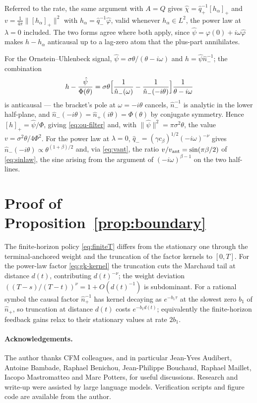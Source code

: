 \documentclass[11pt]{article}
\newcommand{\pluspart}[1]{\left[#1\right]_+}
\theoremstyle{plain}
\theoremstyle{definition}
\theoremstyle{remark}
\begin{document}
Referred to the rate, the same argument with $A=Q$ gives $\hat\chi=\hat q_+^{-1}\pluspart{h_\alpha}$ and $v=\frac1{4\pi}\|\pluspart{h_\alpha}\|^2$ with $h_\alpha=\hat q_-^{-1}\hat\varphi$, valid whenever $h_\alpha\in L^2$, the power law at $\lambda=0$ included. The two forms agree where both apply, since $\hat\psi=\varphi(0)+i\omega\hat\varphi$ makes $h-h_\alpha$ anticausal up to a lag-zero atom that the plus-part annihilates.

For the Ornstein--Uhlenbeck signal, $\hat\psi=\sigma\theta/(\theta-i\omega)$ and $h=\hat\psi\hat n_-^{-1}$; the combination
\[
h - \frac{\hat\psi}{\Phi(\theta)} = \sigma\theta\Bigl[\frac{1}{\hat n_-(\omega)} - \frac{1}{\hat n_-(-i\theta)}\Bigr]\frac{1}{\theta-i\omega}
\]
is anticausal --- the bracket's pole at $\omega=-i\theta$ cancels, $\hat n_-^{-1}$ is analytic in the lower half-plane, and $\hat n_-(-i\theta)=\hat n_+(i\theta)=\Phi(\theta)$ by conjugate symmetry. Hence $\pluspart{h}=\hat\psi/\Phi$, giving \eqref{eq:ou-filter} and, with $\|\hat\psi\|^2=\pi\sigma^2\theta$, the value $v=\sigma^2\theta/4\Phi^2$. For the power law at $\lambda=0$, $\hat q_-=(\gamma c_\beta)^{1/2}(-i\omega)^{-\nu}$ gives $\hat n_-(-i\theta)\propto\theta^{(1+\beta)/2}$ and, via \eqref{eq:vant}, the ratio $v/v_{\rm ant}=\sin(\pi\beta/2)$ of \eqref{eq:sinlaw}, the sine arising from the argument of $(-i\omega)^{\beta-1}$ on the two half-lines.

\section{Proof of Proposition~\ref{prop:boundary}}\label{app:C}
The finite-horizon policy \eqref{eq:finiteT} differs from the stationary one through the terminal-anchored weight and the truncation of the factor kernels to $[0,T]$. For the power-law factor \eqref{eq:gk-kernel} the truncation cuts the Marchaud tail at distance $d(t)$, contributing $d(t)^{-\nu}$; the weight deviation $((T-s)/(T-t))^\nu=1+O(d(t)^{-1})$ is subdominant. For a rational symbol the causal factor $\hat n_+^{-1}$ has kernel decaying as $e^{-b_1\tau}$ at the slowest zero $b_1$ of $\hat n_+$, so truncation at distance $d(t)$ costs $e^{-b_1 d(t)}$; equivalently the finite-horizon feedback gains relax to their stationary values at rate $2b_1$.

\paragraph{Acknowledgements.} The author thanks CFM colleagues, and in particular Jean-Yves Audibert, Antoine Bambade, Raphael Benichou, Jean-Philippe Bouchaud, Raphael Maillet, Iacopo Mastromatteo and Marc Potters, for useful discussions. Research and write-up were assisted by large language models. Verification scripts and figure code are available from the author.



\end{document}
